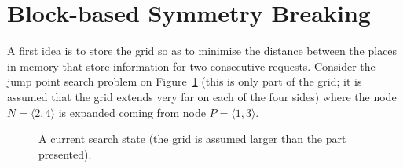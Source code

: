 \section{Block-based Symmetry Breaking}
\label{sec::blocks}

A first idea is to store the grid 
so as to minimise the distance between the places in memory 
that store information for two consecutive requests.  
Consider the jump point search problem 
on Figure~\ref{fig::grid} (this is only part of the grid; 
it is assumed that the grid extends very far on each of the four sides) 
where the node $N = \langle 2,4\rangle$ is expanded 
coming from node $P = \langle 1,3\rangle$.  

\begin{figure}[ht]
  \begin{center}
  \end{center}
  \caption{A current search state 
    (the grid is assumed larger than the part presented).}
  \label{fig::grid}
\end{figure}

